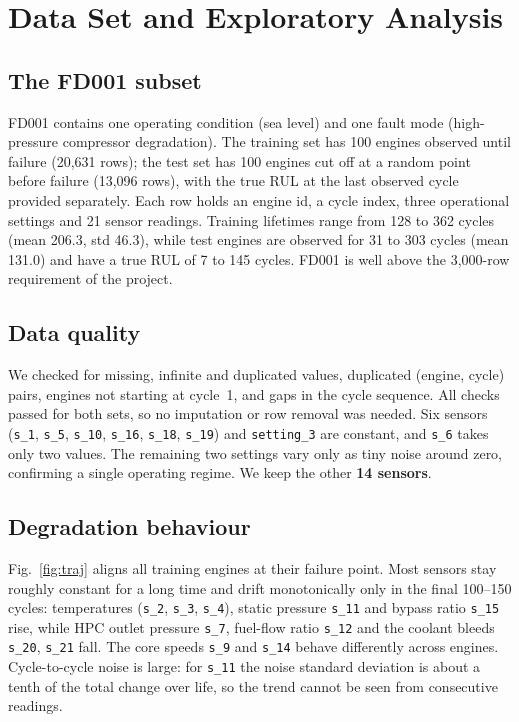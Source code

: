 \documentclass[conference]{IEEEtran}
\newcommand{\sensor}[1]{\texttt{s\_#1}}
\begin{document}
\section{Data Set and Exploratory Analysis}
\subsection{The FD001 subset}
FD001 contains one operating condition (sea level) and one fault mode (high-pressure compressor degradation). The training set has 100 engines observed until failure (20,631 rows); the test set has 100 engines cut off at a random point before failure (13,096 rows), with the true RUL at the last observed cycle provided separately. Each row holds an engine id, a cycle index, three operational settings and 21 sensor readings. Training lifetimes range from 128 to 362 cycles (mean 206.3, std 46.3), while test engines are observed for 31 to 303 cycles (mean 131.0) and have a true RUL of 7 to 145 cycles. FD001 is well above the 3,000-row requirement of the project.

\subsection{Data quality}
We checked for missing, infinite and duplicated values, duplicated (engine, cycle) pairs, engines not starting at cycle~1, and gaps in the cycle sequence. All checks passed for both sets, so no imputation or row removal was needed. Six sensors (\sensor{1}, \sensor{5}, \sensor{10}, \sensor{16}, \sensor{18}, \sensor{19}) and \texttt{setting\_3} are constant, and \sensor{6} takes only two values. The remaining two settings vary only as tiny noise around zero, confirming a single operating regime. We keep the other \textbf{14 sensors}.

\subsection{Degradation behaviour}
Fig.~\ref{fig:traj} aligns all training engines at their failure point. Most sensors stay roughly constant for a long time and drift monotonically only in the final 100--150 cycles: temperatures (\sensor{2}, \sensor{3}, \sensor{4}), static pressure \sensor{11} and bypass ratio \sensor{15} rise, while HPC outlet pressure \sensor{7}, fuel-flow ratio \sensor{12} and the coolant bleeds \sensor{20}, \sensor{21} fall. The core speeds \sensor{9} and \sensor{14} behave differently across engines. Cycle-to-cycle noise is large: for \sensor{11} the noise standard deviation is about a tenth of the total change over life, so the trend cannot be seen from consecutive readings.
\end{document}
